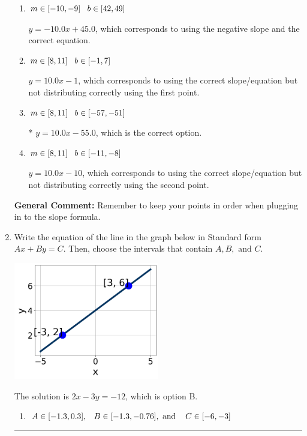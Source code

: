 \documentclass{extbook}[14pt]
\newcommand{\litem}[1]{\item #1

\rule{\textwidth}{0.4pt}}
\begin{document}
\begin{enumerate}
{\begin{enumerate}[label=\Alph*.]
 $y = 10.0x + 55.0$, which corresponds to using the correct slope and getting the negative y-intercept.
\item \( m \in [-10, -9] \hspace*{3mm} b \in [42, 49] \)

 $y = -10.0x + 45.0$, which corresponds to using the negative slope and the correct equation.
\item \( m \in [8, 11] \hspace*{3mm} b \in [-1, 7] \)

 $y = 10.0x -1$, which corresponds to using the correct slope/equation but not distributing correctly using the first point.
\item \( m \in [8, 11] \hspace*{3mm} b \in [-57, -51] \)

* $y = 10.0x -55.0$, which is the correct option.
\item \( m \in [8, 11] \hspace*{3mm} b \in [-11, -8] \)

 $y = 10.0x -10$, which corresponds to using the correct slope/equation but not distributing correctly using the second point.
\end{enumerate}

\textbf{General Comment:} Remember to keep your points in order when plugging in to the slope formula.
}
\litem{
Write the equation of the line in the graph below in Standard form $Ax+By=C$. Then, choose the intervals that contain $A, B, \text{ and } C$.

\begin{center}
    \includegraphics[width=0.5\textwidth]{../Figures/linearGraphToStandardB.png}
\end{center}




The solution is \( 2x - 3y = -12 \), which is option B.\begin{enumerate}[label=\Alph*.]
\item \( A \in [-1.3, 0.3], \hspace{3mm} B \in [-1.3, -0.76], \text{ and } \hspace{3mm} C \in [-6, -3] \)


\end{enumerate}}
\end{enumerate}
\end{document}

